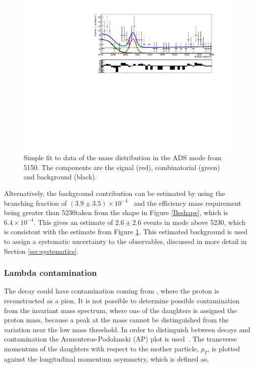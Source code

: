 \begin{figure}
\centering
\includegraphics[width=0.7\linewidth]{figures/backgrounds/adsfit.pdf}
\caption{Simple fit to data of the \B mass distribution in the ADS mode from 5150\mev. The components are the signal (red), combinatorial (green) and \Bs background (black).}
\label{adsfit}
\end{figure}

Alternatively, the \Bs background contribution can be estimated by using the  branching fraction of $\left(3.9 \pm 3.5\right) \times 10^{-4}$~\cite{PDG2016} and the efficiency \Bm mass requirement being greater than 5230\mev taken from the \Bs shape in Figure \ref{Bsshape}, which is $6.4 \times 10^{-4}$. This gives an estimate of $2.6 \pm 2.6$  events in \pik mode above 5230\mev, which is consistent with the estimate from Figure \ref{adsfit}. This estimated \Bs background is used to assign a systematic uncertainty to the \CP observables, discussed in more detail in Section \ref{sec:systematics}.


\subsubsection{Lambda contamination}
\label{sec:backgrounds:contamination}

The \decay{\KS}{\pip\pim} decay could have contamination coming from \decay{\Lz}{\proton\pim}, where the proton is reconstructed as a pion. It is not possible to determine possible \Lz contamination from the \KS invariant mass spectrum, where one of the \KS daughters is assigned the proton mass, because a peak at the \Lz mass cannot be distinguished from the variation near the low mass threshold. In order to distinguish between \KS decays and \Lz contamination the Armenteros-Podolanski (AP) plot is used~\cite{APplot}. The transverse momentum of the daughters with respect to the mother particle, $p_T$, is plotted against the longitudinal momentum asymmetry, which is defined as,

